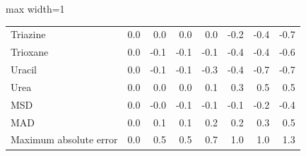 \begin{table}[h]
\begin{adjustbox}{max width=1\textwidth}
\begin{tabular}{lrrrrrrr}
Triazine & 0.0 & 0.0 & 0.0 & 0.0 & -0.2 & -0.4 & -0.7 \\
Trioxane & 0.0 & -0.1 & -0.1 & -0.1 & -0.4 & -0.4 & -0.6 \\
Uracil & 0.0 & -0.1 & -0.1 & -0.3 & -0.4 & -0.7 & -0.7 \\
Urea & 0.0 & 0.0 & 0.0 & 0.1 & 0.3 & 0.5 & 0.5 \\
MSD & 0.0 & -0.0 & -0.1 & -0.1 & -0.1 & -0.2 & -0.4 \\
MAD & 0.0 & 0.1 & 0.1 & 0.2 & 0.2 & 0.3 & 0.5 \\
Maximum absolute error & 0.0 & 0.5 & 0.5 & 0.7 & 1.0 & 1.0 & 1.3 \\
\bottomrule
\end{tabular}
\end{adjustbox}

\end{table}